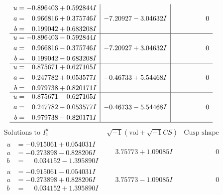 \documentclass[1p]{elsarticle_modified}
\theoremstyle{definition}
\newcommand{\I}{\sqrt{-1}}
\begin{document}
$$\begin{array}{c|c|c}
\begin{aligned}
u &= -0.896403 + 0.592844 I \\
a &= \phantom{-}0.966816 + 0.375746 I \\
b &= \phantom{-}0.199042 + 0.683208 I\end{aligned}
 & -7.20927 - 3.04632 I & \phantom{-0.000000 } 0 \\ \hline\begin{aligned}
u &= -0.896403 - 0.592844 I \\
a &= \phantom{-}0.966816 - 0.375746 I \\
b &= \phantom{-}0.199042 - 0.683208 I\end{aligned}
 & -7.20927 + 3.04632 I & \phantom{-0.000000 } 0 \\ \hline\begin{aligned}
u &= \phantom{-}0.875671 + 0.627105 I \\
a &= \phantom{-}0.247782 + 0.053577 I \\
b &= \phantom{-}0.979738 + 0.820171 I\end{aligned}
 & -0.46733 + 5.54468 I & \phantom{-0.000000 } 0 \\ \hline\begin{aligned}
u &= \phantom{-}0.875671 - 0.627105 I \\
a &= \phantom{-}0.247782 - 0.053577 I \\
b &= \phantom{-}0.979738 - 0.820171 I\end{aligned}
 & -0.46733 - 5.54468 I & \phantom{-0.000000 } 0\\
 \hline 
 \end{array}$$\newpage$$\begin{array}{c|c|c}  
\text{Solutions to }I^u_{1}& \I (\text{vol} + \sqrt{-1}CS) & \text{Cusp shape}\\
 \hline 
\begin{aligned}
u &= -0.915061 + 0.054031 I \\
a &= -0.273898 - 0.828206 I \\
b &= \phantom{-}0.034152 - 1.395890 I\end{aligned}
 & \phantom{-}3.75773 + 1.09085 I & \phantom{-0.000000 } 0 \\ \hline\begin{aligned}
u &= -0.915061 - 0.054031 I \\
a &= -0.273898 + 0.828206 I \\
b &= \phantom{-}0.034152 + 1.395890 I\end{aligned}
 & \phantom{-}3.75773 - 1.09085 I & \phantom{-0.000000 } 0 \\ \hline\begin{aligned}

\end{aligned}
\end{array}$$
\end{document}
